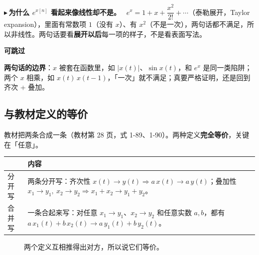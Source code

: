\documentclass[UTF8,a4paper,11pt]{ctexart}
\newenvironment{skippable}{\begin{skipbox}\textbf{可跳过}\par\smallskip}{\end{skipbox}}
\newcounter{ex}[section]
\newcommand{\point}[1]{\par\addvspace{1ex}\noindent\textcolor{ptteal}{$\blacktriangleright$\,\textbf{#1}}\ }
\begin{document}
\point{为什么 $e^{x[n]}$ 看起来像线性却不是。}
$e^{x}=1+x+\dfrac{x^2}{2!}+\cdots$（泰勒展开，Taylor expansion），里面有常数项 $1$（没有 $x$）、有 $x^2$（不是一次），两句话都不满足，所以非线性。两句话要看\textbf{展开以后}每一项的样子，不是看表面写法。

\begin{skippable}
\textbf{两句话的边界}：$x$ 被套在函数里，如 $|x(t)|$、$\sin x(t)$，和 $e^{x}$ 是同一类陷阱；两个 $x$ 相乘，如 $x(t)\,x(t-1)$，「一次」就不满足；真要严格证明，还是回到齐次 + 叠加。
\end{skippable}

\subsection{与教材定义的等价}
教材把两条合成一条（教材第 28 页，式 1-89、1-90）。两种定义\textbf{完全等价}，关键在「任意」。

\begin{center}
\renewcommand{\arraystretch}{1.3}
\begin{tabular}{@{}p{2.2cm}p{12.6cm}@{}}
\toprule
 & 内容\\
\midrule
分开写 & 两条分开写：齐次性 $x(t)\to y(t)\Rightarrow a\,x(t)\to a\,y(t)$；叠加性 $x_1\to y_1,\ x_2\to y_2\Rightarrow x_1+x_2\to y_1+y_2$。\\
合并写 & 一条合起来写：对任意 $x_1\to y_1$、$x_2\to y_2$ 和任意实数 $a,b$，都有 $a\,x_1(t)+b\,x_2(t)\to a\,y_1(t)+b\,y_2(t)$。\\
\bottomrule
\end{tabular}
\end{center}

\begin{figure}[H]
\centering
{}
\caption{两个定义互相推得出对方，所以说它们等价。}
\end{figure}
\end{document}
